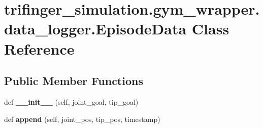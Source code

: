 \hypertarget{classtrifinger__simulation_1_1gym__wrapper_1_1data__logger_1_1EpisodeData}{}\section{trifinger\+\_\+simulation.\+gym\+\_\+wrapper.\+data\+\_\+logger.\+Episode\+Data Class Reference}
\label{classtrifinger__simulation_1_1gym__wrapper_1_1data__logger_1_1EpisodeData}
\subsection*{Public Member Functions}
\begin{DoxyCompactItemize}
\item 
\mbox{\label{classtrifinger__simulation_1_1gym__wrapper_1_1data__logger_1_1EpisodeData_a995b85cb8a75c0f9b513cb65ba0f6d4f}} 
def {\bfseries \+\_\+\+\_\+init\+\_\+\+\_\+} (self, joint\+\_\+goal, tip\+\_\+goal)
\item 
\mbox{\label{classtrifinger__simulation_1_1gym__wrapper_1_1data__logger_1_1EpisodeData_ae7b701ac5f0cc636f4e35494088457f8}} 
def {\bfseries append} (self, joint\+\_\+pos, tip\+\_\+pos, timestamp)
\end{DoxyCompactItemize}

